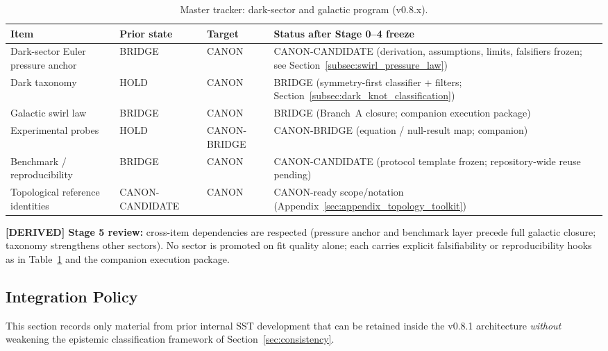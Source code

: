 \documentclass[11pt]{article}
\theoremstyle{definition}
\theoremstyle{plain}
\theoremstyle{remark}
\begin{document}
        \begin{table}[h]
        \centering
        \caption{Master tracker: dark-sector and galactic program (v0.8.x).}
        \label{tab:dark-sector-master-tracker}
        \begin{tabular}{p{4.2cm}p{2.3cm}p{2.5cm}p{5.5cm}}
        \hline
        Item & Prior state & Target & Status after Stage 0--4 freeze \\
        \hline
        Dark-sector Euler pressure anchor & BRIDGE & CANON & CANON-CANDIDATE (derivation, assumptions, limits, falsifiers frozen; see Section~\ref{subsec:swirl_pressure_law}) \\
        Dark taxonomy & HOLD & CANON & BRIDGE (symmetry-first classifier + filters; Section~\ref{subsec:dark_knot_classification}) \\
        Galactic swirl law & BRIDGE & CANON & BRIDGE (Branch~A closure; companion execution package) \\
        Experimental probes & HOLD & CANON-BRIDGE & CANON-BRIDGE (equation / null-result map; companion) \\
        Benchmark / reproducibility & BRIDGE & CANON & CANON-CANDIDATE (protocol template frozen; repository-wide reuse pending) \\
        Topological reference identities & CANON-CANDIDATE & CANON & CANON-ready scope/notation (Appendix~\ref{sec:appendix_topology_toolkit}) \\
        \hline
        \end{tabular}
        \end{table}

        \textbf{[DERIVED] Stage 5 review:} cross-item dependencies are respected (pressure anchor and benchmark layer precede full galactic closure; taxonomy strengthens other sectors). No sector is promoted on fit quality alone; each carries explicit falsifiability or reproducibility hooks as in Table~\ref{tab:dark-sector-master-tracker} and the companion execution package.

    \subsection{Integration Policy}

        This section records only material from prior internal SST development that can be retained inside the
        v0.8.1 architecture \emph{without} weakening the epistemic classification framework of
        Section~\ref{sec:consistency}.
\end{document}
